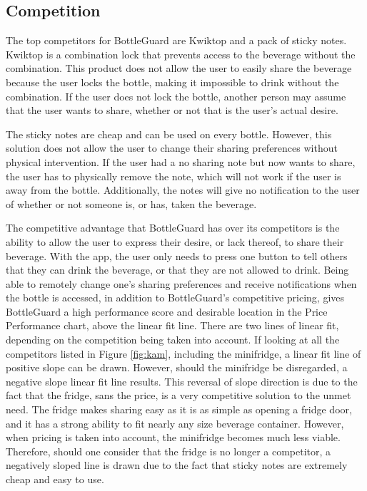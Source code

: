 \documentclass[12pt]{article}
\begin{document}
	\subsection*{Competition}
	The top competitors for BottleGuard are Kwiktop and a pack of sticky notes. Kwiktop is a combination lock that prevents access to the beverage without the combination. This product does not allow the user to easily share the beverage because the user locks the bottle, making it impossible to drink without the combination. If the user does not lock the bottle, another person may assume that the user wants to share, whether or not that is the user’s actual desire. 
	
	The sticky notes are cheap and can be used on every bottle. However, this solution does not allow the user to change their sharing preferences without physical intervention. If the user had a no sharing note but now wants to share, the user has to physically remove the note, which will not work if the user is away from the bottle. Additionally, the notes will give no notification to the user of whether or not someone is, or has, taken the beverage. 
	
	The competitive advantage that BottleGuard has over its competitors is the ability to allow the user to express their desire, or lack thereof, to share their beverage. With the app, the user only needs to press one button to tell others that they can drink the beverage, or that they are not allowed to drink.  Being able to remotely change one’s sharing preferences and receive notifications when the bottle is accessed, in addition to BottleGuard’s competitive pricing, gives BottleGuard a high performance score and desirable location in the Price Performance chart, above the linear fit line. 
	There are two lines of linear fit, depending on the competition being taken into account.  If looking at all the competitors listed in Figure \ref{fig:kam}, including the minifridge, a linear fit line of positive slope can be drawn.  However, should the minifridge be disregarded, a negative slope linear fit line results.  This reversal of slope direction is due to the fact that the fridge, sans the price, is a very competitive solution to the unmet need.  The fridge makes sharing easy as it is as simple as opening a fridge door, and it has a strong ability to fit nearly any size beverage container.  However, when pricing is taken into account, the minifridge becomes much less viable.  Therefore, should one consider that the fridge is no longer a competitor, a negatively sloped line is drawn due to the fact that sticky notes are extremely cheap and easy to use.
	
\end{document}
